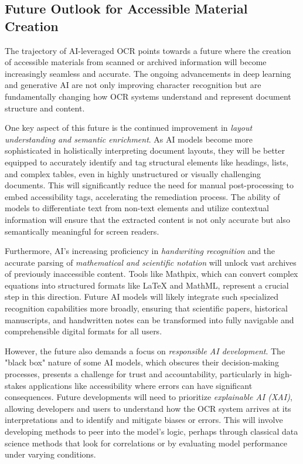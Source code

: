 \subsection{Future Outlook for Accessible Material Creation}
\vspace{1em}

The trajectory of AI-leveraged OCR points towards a future where the creation of accessible materials from scanned or archived information will become increasingly seamless and accurate. The ongoing advancements in deep learning and generative AI are not only improving character recognition but are fundamentally changing how OCR systems understand and represent document structure and content.

One key aspect of this future is the continued improvement in \emph{layout understanding and semantic enrichment}. As AI models become more sophisticated in holistically interpreting document layouts, they will be better equipped to accurately identify and tag structural elements like headings, lists, and complex tables, even in highly unstructured or visually challenging documents. \cite{BeyondKeyAIOCR} This will significantly reduce the need for manual post-processing to embed accessibility tags, accelerating the remediation process. The ability of models to differentiate text from non-text elements and utilize contextual information will ensure that the extracted content is not only accurate but also semantically meaningful for screen readers. \cite{MediumLayoutLMv3, BeyondKeyAIOCR}

Furthermore, AI's increasing proficiency in \emph{handwriting recognition} and the accurate parsing of \emph{mathematical and scientific notation} will unlock vast archives of previously inaccessible content. \cite{BeyondKeyAIOCR} Tools like Mathpix, which can convert complex equations into structured formats like LaTeX and MathML, represent a crucial step in this direction. \cite{Mathpix} \cite{TPGIMathAccessible} Future AI models will likely integrate such specialized recognition capabilities more broadly, ensuring that scientific papers, historical manuscripts, and handwritten notes can be transformed into fully navigable and comprehensible digital formats for all users.

However, the future also demands a focus on \emph{responsible AI development}. The "black box" nature of some AI models, which obscures their decision-making processes, presents a challenge for trust and accountability, particularly in high-stakes applications like accessibility where errors can have significant consequences. \cite{AbstractaBlackBoxAI, UMDearbornBlackBoxAI} Future developments will need to prioritize \emph{explainable AI (XAI)}, allowing developers and users to understand how the OCR system arrives at its interpretations and to identify and mitigate biases or errors. \cite{AbstractaBlackBoxAI, UMDearbornBlackBoxAI} This will involve developing methods to peer into the model's logic, perhaps through classical data science methods that look for correlations or by evaluating model performance under varying conditions. \cite{UMDearbornBlackBoxAI}

